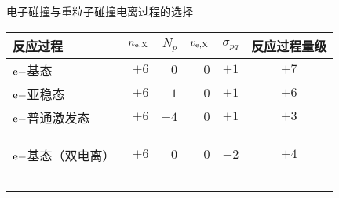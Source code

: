 \begin{CJK*}{UTF8}{kai}
\begin{frame}{电子碰撞与重粒子碰撞电离过程的选择}
\centering
\begin{table}%
\begin{center}
\begin{tabular}{lrrrrc}\toprule[1.5pt]
反应过程 & $n_{\rm e,X}$ & $N_{p}$ & $v_{\rm e,X}$ & $\sigma_{pq}$ & 反应过程量级\\
\midrule[1pt]
${\rm e-}$基态       & $+6$ & $0$  & $0$  & $+1$ & $+7$ \\
${\rm e-}$亚稳态     & $+6$ & $-1$ & $0$  & $+1$ & $+6$ \\
${\rm e-}$普通激发态 & $+6$ & $-4$ & $0$  & $+1$ & $+3$ \\
\color{gray}{${\rm X-}$基态}       & \color{gray}{$+4$} & \color{gray}{$0$}  & \color{gray}{$-3$} & \color{gray}{$-3$} & \color{gray}{$-2$} \\
\color{gray}{${\rm X-}$亚稳态}     & \color{gray}{$+4$} & \color{gray}{$-1$} & \color{gray}{$-3$} & \color{gray}{$-3$} & \color{gray}{$-3$} \\
\color{gray}{${\rm X-}$普通激发态} & \color{gray}{$+4$} & \color{gray}{$-4$} & \color{gray}{$-3$} & \color{gray}{$-3$} & \color{gray}{$-6$} \\
${\rm e-}$基态（双电离）       & $+6$ & $0$  & $0$  & $-2$  & $+4$ \\
\color{gray}{${\rm e-}$亚稳态（双电离）}     & \color{gray}{$+6$} & \color{gray}{$-1$} & \color{gray}{$0$}  & \color{gray}{$-2$}  & \color{gray}{$+3$} \\
\color{gray}{${\rm e-}$普通激发态（双电离）} & \color{gray}{$+6$} & \color{gray}{$-4$} & \color{gray}{$0$}  & \color{gray}{$-2$}  & \hspace{0.8em}\color{gray}{$0$} \\
\color{gray}{${\rm X-}$基态（双电离）}       & \color{gray}{$+4$} & \color{gray}{$0$}  & \color{gray}{$-3$} & \color{gray}{$-3$} & \color{gray}{$-2$} \\
\color{gray}{${\rm X-}$亚稳态（双电离）}     & \color{gray}{$+4$} & \color{gray}{$-1$} & \color{gray}{$-3$} & \color{gray}{$-3$} & \color{gray}{$-3$} \\
\color{gray}{${\rm X-}$普通激发态（双电离）} & \color{gray}{$+4$} & \color{gray}{$-4$} & \color{gray}{$-3$} & \color{gray}{$-3$} & \color{gray}{$-6$} \\
\bottomrule[1.5pt]
\end{tabular}
\end{center}
\end{table}
\end{frame}



\end{CJK*}
